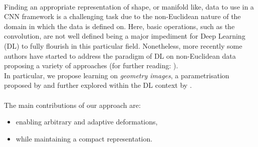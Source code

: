 \\
Finding an appropriate representation of shape, or manifold like, data to use in a CNN framework is a challenging task due to the non-Euclidean nature of the domain in which the data is defined on. Here, basic operations, such as the convolution, are not well defined being a major impediment for Deep Learning (DL) to fully flourish in this particular field. Nonetheless, more recently some authors have started to address the paradigm of DL on non-Euclidean data proposing a variety of approaches \cite{Masci2015ShapeNetCN, Geometric_deep_learning, CNN_on_Torus} (for further reading: \cite{GeoDeepLearning}). \\
In particular, we propose learning on \textit{geometry images}, a parametrisation proposed by \citep{gu2002geometry} and further explored within the DL context by \cite{Sinha2016DeepL3}.   
\\
\\
The main contributions of our approach are: 
\begin{itemize}
\item enabling arbitrary and adaptive deformations,
\item while maintaining a compact representation. 
\end{itemize}
